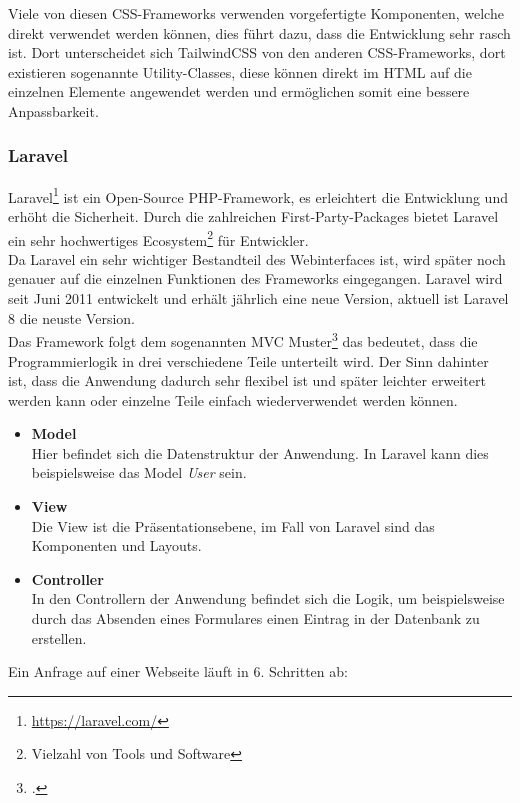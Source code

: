 Viele von diesen CSS-Frameworks verwenden vorgefertigte Komponenten, welche direkt
verwendet werden können, dies führt dazu, dass die Entwicklung sehr rasch ist.
Dort unterscheidet sich TailwindCSS von den anderen CSS-Frameworks, dort
existieren sogenannte Utility-Classes, diese können direkt im \acs*{HTML} auf
die einzelnen Elemente angewendet werden und ermöglichen somit eine bessere Anpassbarkeit.

\subsubsection{Laravel}
Laravel\footnote{\url{https://laravel.com/}} ist ein Open-Source PHP-Framework,
es erleichtert die Entwicklung und erhöht die Sicherheit. Durch die
zahlreichen First-Party-Packages bietet Laravel ein sehr hochwertiges
Ecosystem\footnote{Vielzahl von Tools und Software}
für Entwickler.\\

Da Laravel ein sehr wichtiger Bestandteil des Webinterfaces ist, wird später noch
genauer auf die einzelnen Funktionen des Frameworks eingegangen. Laravel wird
seit Juni 2011 entwickelt und erhält jährlich eine neue Version, aktuell ist
Laravel 8 die neuste Version.\\

Das Framework folgt dem sogenannten \ac*{MVC} Muster\footcite[]{stauffer2019laravel} das bedeutet, dass die
Programmierlogik in drei verschiedene Teile unterteilt wird. Der Sinn dahinter
ist, dass die Anwendung dadurch sehr flexibel ist und später leichter erweitert
werden kann oder einzelne Teile einfach wiederverwendet werden können.

\begin{itemize}
  \item \textbf{Model} \\
  Hier befindet sich die Datenstruktur der Anwendung. In Laravel kann dies
  beispielsweise das Model \textit{User} sein.
  \item \textbf{View} \\
  Die View ist die Präsentationsebene, im Fall von Laravel sind das
  Komponenten und Layouts.
  \item \textbf{Controller} \\
  In den Controllern der Anwendung befindet sich die Logik, um beispielsweise
  durch das Absenden eines Formulares einen Eintrag in der Datenbank zu
  erstellen. 
\end{itemize}

Ein Anfrage auf einer Webseite läuft in 6. Schritten ab:

